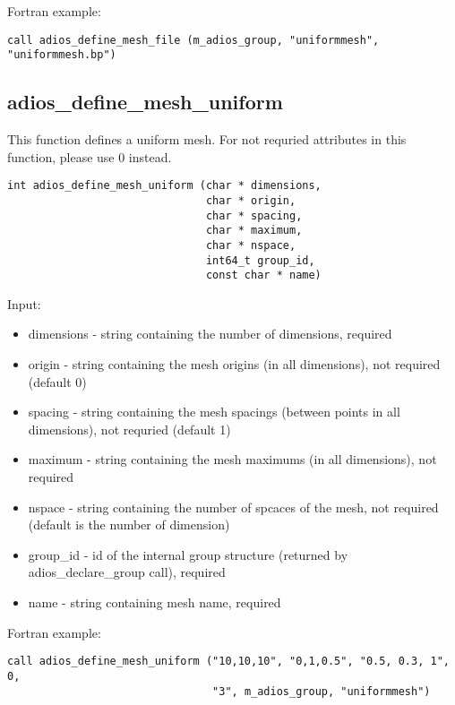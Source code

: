 Fortran example:
\begin{lstlisting}[alsolanguage=Fortran,caption={},label={}]
call adios_define_mesh_file (m_adios_group, "uniformmesh", "uniformmesh.bp")
\end{lstlisting}


\subsection{adios\_define\_mesh\_uniform}
This function defines a uniform mesh. For not requried attributes in this function, please use 0 instead.

\begin{lstlisting}[alsolanguage=Fortran,caption={},label={}]
int adios_define_mesh_uniform (char * dimensions,
                               char * origin,
                               char * spacing,
                               char * maximum,
                               char * nspace,
                               int64_t group_id,
                               const char * name)
\end{lstlisting}

Input:
\begin{itemize}
\item dimensions - string containing the number of dimensions, required
\item origin - string containing the mesh origins (in all dimensions), not required (default 0)
\item spacing - string containing the mesh spacings (between points in all dimensions), not requried (default 1)
\item maximum - string containing the mesh maximums (in all dimensions), not required
\item nspace - string containing the number of spcaces of the mesh, not required (default is the number of dimension)
\item group\_id - id of the internal group structure (returned by adios\_declare\_group call), required
\item name - string containing mesh name, required
\end{itemize}

Fortran example:
\begin{lstlisting}[alsolanguage=Fortran,caption={},label={}]
call adios_define_mesh_uniform ("10,10,10", "0,1,0.5", "0.5, 0.3, 1", 0, 
                                "3", m_adios_group, "uniformmesh")
\end{lstlisting}


